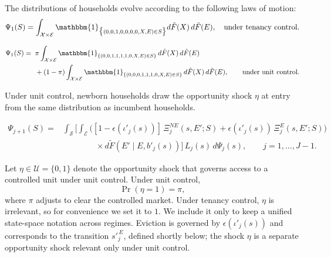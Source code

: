 \documentclass[parskip=full]{article}
\begin{document}
The distributions of households evolve according to the following laws of motion:
\begin{equation}\label{eq:lom1}
\Psi_{1}(S) = \int_{\mathcal{X} \times \mathcal{E}} \mathbbm{1}_{\big\{ (0,0,1,0,0,0,0,X,E) \in S \big\}} d\hat{F}(X)\, d\tilde{F}(E), \quad \text{under tenancy control.}
\end{equation}

\begin{equation}\label{eq:lom1_2}
\begin{aligned}
\Psi_{1}(S)={}&\;\pi \int_{\mathcal{X}\times\mathcal{E}}
\mathbbm{1}_{\{(0,0,1,1,1,1,0,X,E)\in S\}}\, d\hat F(X)\, d\tilde F(E)\\&\;+(1-\pi)\int_{\mathcal{X}\times\mathcal{E}}
\mathbbm{1}_{\{(0,0,0,1,1,1,0,X,E)\in S\}}\, d\hat F(X)\, d\tilde F(E),\qquad \text{under unit control.}
\end{aligned}
\end{equation}

\noindent Under unit control, newborn households draw the opportunity shock $\eta$ at entry from the same distribution as incumbent households.

\begin{equation}\label{eq:lom2}
\begin{aligned}
\Psi_{j+1}(S)={}&\int_{\mathcal{S}}\Bigg[\int_{\mathcal{E}}
\Big([1-\epsilon(\iota'_j(s))]\,\Xi^{NE}_j(s,E';S)
+\epsilon(\iota'_j(s))\,\Xi^{E}_j(s,E';S)\Big)
\\[-0.2em]
&\hspace{4em}\times d\tilde F\!\left(E' \mid E,b'_j(s)\right)\Bigg]\,L_j(s)\, d\Psi_j(s),\qquad j=1,\ldots,J-1.
\end{aligned}
\end{equation}

\noindent Let $\eta\in\mathcal{U}=\{0,1\}$ denote the opportunity shock that governs access to a controlled unit under unit control.  Under unit control,
\[
\Pr(\eta=1)=\pi,
\]
where $\pi$ adjusts to clear the controlled market. Under tenancy control, $\eta$ is irrelevant, so for convenience we set it to $1$. We include it only to keep a unified state-space notation across regimes. Eviction is governed by $\epsilon(\iota'_j(s))$ and corresponds to the transition $s'^{\,E}_j$, defined shortly below; the shock $\eta$ is a separate opportunity shock relevant only under unit control.
\end{document}
